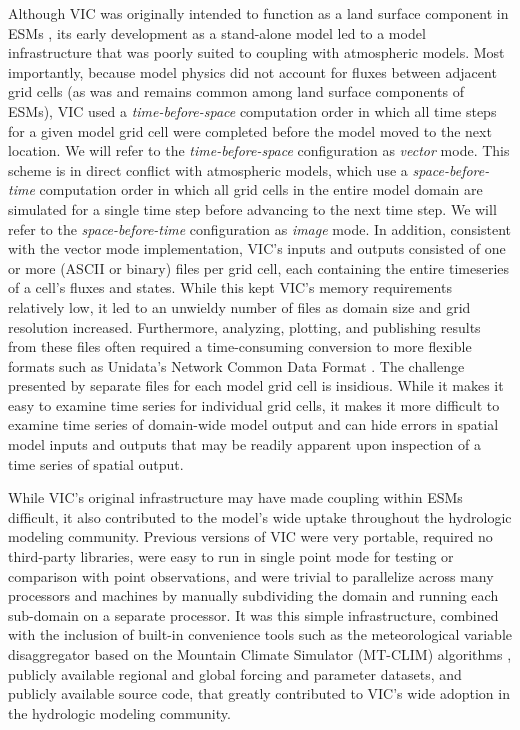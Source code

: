 \documentclass[gmd, manuscript]{copernicus}
\begin{document}
  Although VIC was originally intended to function as a land surface component in ESMs \citep{Liang_1994}, its early development as a stand-alone model led to a model infrastructure that was poorly suited to coupling with atmospheric models.  Most importantly, because model physics did not account for fluxes between adjacent grid cells (as was and remains common among land surface components of ESMs), VIC used a \textit{time-before-space} computation order in which all time steps for a given model grid cell were completed before the model moved to the next location. We will refer to the \textit{time-before-space} configuration as \textit{vector} mode.  This scheme is in direct conflict with atmospheric models, which use a \textit{space-before-time} computation order in which all grid cells in the entire model domain are simulated for a single time step before advancing to the next time step. We will refer to the \textit{space-before-time} configuration as \textit{image} mode. In addition, consistent with the vector mode implementation, VIC's inputs and outputs consisted of one or more (ASCII or binary) files per grid cell, each containing the entire timeseries of a cell's fluxes and states. While this kept VIC's memory requirements relatively low, it led to an unwieldy number of files as domain size and grid resolution increased. Furthermore, analyzing, plotting, and publishing results from these files often required a time-consuming conversion to more flexible formats such as Unidata's Network Common Data Format \citep[NetCDF; ][]{Rew_1990}. The challenge presented by separate files for each model grid cell is insidious. While it makes it easy to examine time series for individual grid cells, it makes it more difficult to examine time series of domain-wide model output and can hide errors in spatial model inputs and outputs that may be readily apparent upon inspection of a time series of spatial output.

  While VIC's original infrastructure may have made coupling within ESMs difficult, it also contributed to the model's wide uptake throughout the hydrologic modeling community. Previous versions of VIC were very portable, required no third-party libraries, were easy to run in single point mode for testing or comparison with point observations, and were trivial to parallelize across many processors and machines by manually subdividing the domain and running each sub-domain on a separate processor. It was this simple infrastructure, combined with the inclusion of built-in convenience tools such as the meteorological variable disaggregator based on the Mountain Climate Simulator (MT-CLIM) algorithms \citep{Thornton_1999,Bohn_2013}, publicly available regional and global forcing and parameter datasets, and publicly available source code, that greatly contributed to VIC's wide adoption in the hydrologic modeling community.
\end{document}
